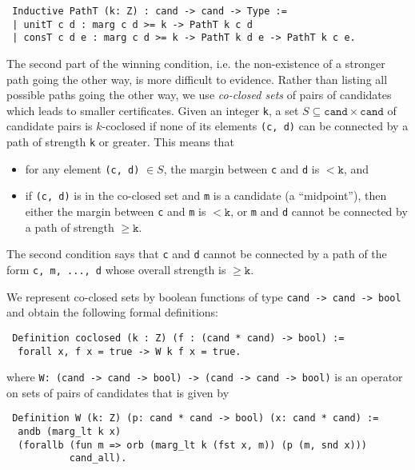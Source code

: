 \documentclass{llncs}
\begin{document}
\begin{verbatim}
 Inductive PathT (k: Z) : cand -> cand -> Type :=   
 | unitT c d : marg c d >= k -> PathT k c d   
 | consT c d e : marg c d >= k -> PathT k d e -> PathT k c e.
\end{verbatim}

\noindent
The second part of the winning condition, i.e. the non-existence of
a stronger path going the other way, is more difficult to evidence.
Rather than listing all possible paths going the other way,
we use \emph{co-closed sets} of pairs of candidates which leads to
smaller certificates. Given an
integer \texttt{k}, a set $S \subseteq \mathtt{cand} \times
\mathtt{cand}$ of candidate pairs is $k$-coclosed if none of its 
elements \texttt{(c,
d)} can be connected by a path of strength \texttt{k} or greater. 
This means that 
\begin{itemize}
  \item for any element \texttt{(c, d)} $\in S$, the margin between
\texttt{c} and \texttt{d} is $< \mathtt{k}$, and
  \item if \texttt{(c, d)} is in the co-closed set and \texttt{m} is
a candidate (a ``midpoint''), then either the margin between
\texttt{c} and \texttt{m} is $< \mathtt{k}$, or \texttt{m} and
\texttt{d} cannot be connected by a path of strength $\geq \mathtt{k}$.
\end{itemize}

\noindent
The second condition says that \texttt{c} and \texttt{d} cannot be
connected by a path of the form \texttt{c, m, ..., d} whose overall
strength is $\geq \mathtt{k}$.

We represent co-closed sets by boolean functions of type
\texttt{cand -> cand -> bool} and obtain the following formal
definitions:

\begin{verbatim}
 Definition coclosed (k : Z) (f : (cand * cand) -> bool) :=     
  forall x, f x = true -> W k f x = true.   
\end{verbatim} 

\noindent where \texttt{W: (cand -> cand -> bool) -> (cand -> cand
-> bool)} is an operator on sets of pairs of candidates that is given by


\begin{verbatim} 
 Definition W (k: Z) (p: cand * cand -> bool) (x: cand * cand) := 
  andb (marg_lt k x) 
  (forallb (fun m => orb (marg_lt k (fst x, m)) (p (m, snd x))) 
           cand_all).
\end{verbatim}
\end{document}
